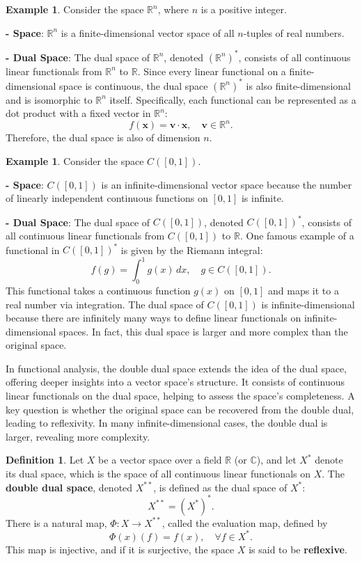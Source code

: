 \documentclass[12pt, reqno]{amsart}
\theoremstyle{definition}
\newtheorem{definition}[theorem]{Definition}
\newtheorem{example}[theorem]{Example}
\numberwithin{equation}{section}
\newcommand{\dC}{{\mathbb C}}
\newcommand{\dR}{{\mathbb R}}
\begin{document}
\begin{example}
Consider the space $\dR^n$, where $n$ is a positive integer.

\textbf{- Space}: $\dR^n$ is a finite-dimensional vector space of all $n$-tuples of real numbers.

\textbf{- Dual Space}: The dual space of $\dR^n$, denoted $(\dR^n)^*$, consists of all continuous linear functionals from $\dR^n$ to $\dR$. Since every linear functional on a finite-dimensional space is continuous, the dual space $(\dR^n)^*$ is also finite-dimensional and is isomorphic to $\dR^n$ itself. Specifically, each functional can be represented as a dot product with a fixed vector in $\dR^n$:
\[
f(\mathbf{x}) = \mathbf{v} \cdot \mathbf{x}, \quad \mathbf{v} \in \dR^n.
\]
Therefore, the dual space is also of dimension $n$.
\end{example}

\begin{example}
Consider the space $C([0,1])$.

\textbf{- Space}: $C([0,1])$ is an infinite-dimensional vector space because the number of linearly independent continuous functions on $[0,1]$ is infinite.

\textbf{- Dual Space}: The dual space of $C([0,1])$, denoted $C([0,1])^*$, consists of all continuous linear functionals from $C([0,1])$ to $\dR$. One famous example of a functional in $C([0,1])^*$ is given by the Riemann integral:
\[
f(g) = \int_0^1 g(x) \, dx, \quad g \in C([0,1]).
\]
This functional takes a continuous function $g(x)$ on $[0,1]$ and maps it to a real number via integration. The dual space of $C([0,1])$ is infinite-dimensional because there are infinitely many ways to define linear functionals on infinite-dimensional spaces. In fact, this dual space is larger and more complex than the original space.
\end{example}

In functional analysis, the double dual space extends the idea of the dual space, offering deeper insights into a vector space's structure. It consists of continuous linear functionals on the dual space, helping to assess the space's completeness. A key question is whether the original space can be recovered from the double dual, leading to reflexivity. In many infinite-dimensional cases, the double dual is larger, revealing more complexity.

\begin{definition}
Let $X$ be a vector space over a field $\dR$ (or $\dC$), and let $X^*$ denote its dual space, which is the space of all continuous linear functionals on $X$. The \textbf{double dual space}, denoted $X^{**}$, is defined as the dual space of $X^*$:
\[
X^{**} = (X^*)^*.
\]
There is a natural map, $\Phi: X \to X^{**}$, called the evaluation map, defined by
\[
\Phi(x)(f) = f(x), \quad \forall f \in X^*.
\]
This map is injective, and if it is surjective, the space $X$ is said to be \textbf{reflexive}.
\end{definition}
\end{document}
